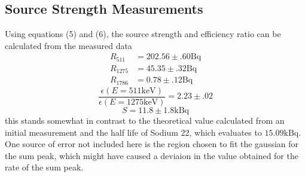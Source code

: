 \documentclass[11pt]{article} %
\begin{document}
    \subsection{Source Strength Measurements}
        Using equations (5) and (6), the source strength and efficiency ratio can be calculated from the measured data
        \begin{align*}
            R_{511} &= 202.56\pm.60\unit{\becquerel}\\
            R_{1275} &= 45.35\pm.32\unit{\becquerel}\\
            R_{1786} &= 0.78\pm.12\unit{\becquerel}
        \end{align*}
        \begin{equation}
            \frac{\epsilon(E=511\unit{\keV})}{\epsilon(E=1275\unit{\keV})} = 2.23\pm.02
        \end{equation}
        \begin{equation}
            S = 11.8\pm1.8\unit{\kilo\becquerel}
        \end{equation}
        this stands somewhat in contrast to the theoretical value calculated from an initial measurement and the half life of Sodium $22$, which evaluates to $15.09\unit{\kilo\becquerel}$. One source of error not included here is the region chosen to fit the gaussian for the sum peak, which might have caused a deviaion in the value obtained for the rate of the sum peak.
\end{document}
